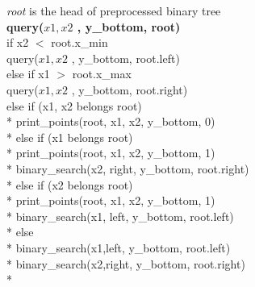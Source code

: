 \documentclass{article}
\begin{document}
\emph{root} is the head of preprocessed binary tree \\
{\bf query($x1, x2$ , y\_bottom, root)}\\
\hspace*{1cm}if x2 $<$ root.x\_min\\
\hspace*{2cm}    query($x1, x2$ , y\_bottom, root.left)\\
\hspace*{1cm}else if x1 $>$ root.x\_max \\
\hspace*{2cm}    query($x1, x2$ , y\_bottom, root.right)\\
\hspace*{1cm}else if (x1, x2 belongs root) \\* 
\hspace*{2cm} print\_points(root, x1, x2, y\_bottom, 0) \\*  
\hspace*{1cm}else if (x1 belongs root) \\*
\hspace*{1.5cm} print\_points(root, x1, x2, y\_bottom, 1) \\*
\hspace*{1.5cm} binary\_search(x2, right, y\_bottom, root.right) \\*
\hspace*{1cm}else if (x2 belongs root) \\*
\hspace*{1.5cm} print\_points(root, x1, x2, y\_bottom, 1) \\*
\hspace*{1.5cm} binary\_search(x1, left, y\_bottom, root.left) \\*
\hspace*{1cm}else  \\*
\hspace*{2cm}binary\_search(x1,left, y\_bottom, root.left) \\*
\hspace*{2cm}binary\_search(x2,right, y\_bottom, root.right) \\*
\end{document}
